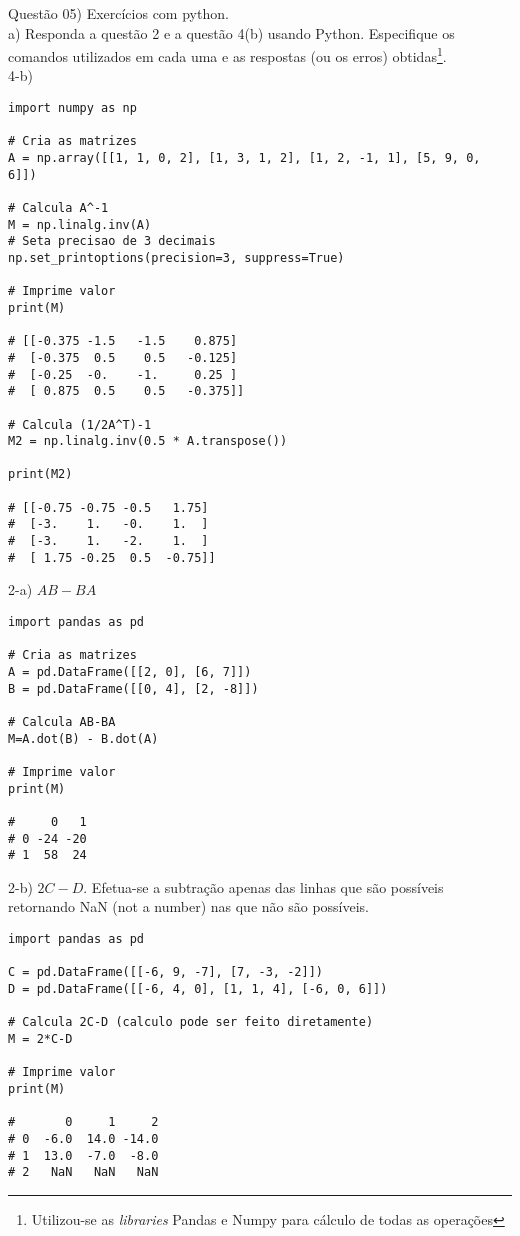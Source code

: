 
\noindent \textcolor{COLOR1}{Questão 05)} Exercícios com python.
\\

a) Responda a questão 2 e a questão 4(b) usando Python. Especifique os comandos utilizados em cada uma e as respostas (ou os erros) obtidas\footnote{Utilizou-se as \textit{libraries} Pandas e Numpy para cálculo de todas as operações}.
\\

4-b)
\\

\begin{lstlisting}
import numpy as np

# Cria as matrizes
A = np.array([[1, 1, 0, 2], [1, 3, 1, 2], [1, 2, -1, 1], [5, 9, 0, 6]])

# Calcula A^-1
M = np.linalg.inv(A)
# Seta precisao de 3 decimais
np.set_printoptions(precision=3, suppress=True)

# Imprime valor
print(M)

# [[-0.375 -1.5   -1.5    0.875]
#  [-0.375  0.5    0.5   -0.125]
#  [-0.25  -0.    -1.     0.25 ]
#  [ 0.875  0.5    0.5   -0.375]]

# Calcula (1/2A^T)-1
M2 = np.linalg.inv(0.5 * A.transpose())

print(M2)

# [[-0.75 -0.75 -0.5   1.75]
#  [-3.    1.   -0.    1.  ]
#  [-3.    1.   -2.    1.  ]
#  [ 1.75 -0.25  0.5  -0.75]]
\end{lstlisting}


2-a) $AB-BA$
\\

\begin{lstlisting}
import pandas as pd

# Cria as matrizes
A = pd.DataFrame([[2, 0], [6, 7]])
B = pd.DataFrame([[0, 4], [2, -8]])

# Calcula AB-BA
M=A.dot(B) - B.dot(A)

# Imprime valor
print(M)

#     0   1
# 0 -24 -20
# 1  58  24
\end{lstlisting}


2-b) $2C-D$. Efetua-se a subtração apenas das linhas que são possíveis retornando NaN (not a number) nas que não são possíveis.
\\

\begin{lstlisting}
import pandas as pd

C = pd.DataFrame([[-6, 9, -7], [7, -3, -2]])
D = pd.DataFrame([[-6, 4, 0], [1, 1, 4], [-6, 0, 6]])

# Calcula 2C-D (calculo pode ser feito diretamente)
M = 2*C-D

# Imprime valor
print(M)

#       0     1     2
# 0  -6.0  14.0 -14.0
# 1  13.0  -7.0  -8.0
# 2   NaN   NaN   NaN
\end{lstlisting}


